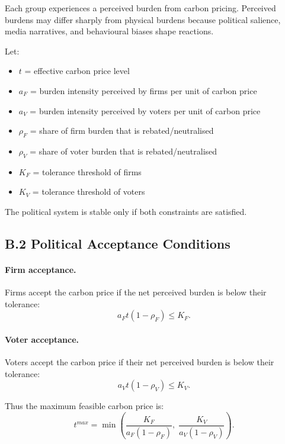 \documentclass[12pt]{article}
\begin{document}
Each group experiences a perceived burden from carbon pricing. Perceived burdens may differ sharply from physical burdens because political salience, media narratives, and behavioural biases shape reactions.


Let:
\begin{itemize}
\item $t$ = effective carbon price level
\item $a_F$ = burden intensity perceived by firms per unit of carbon price
\item $a_V$ = burden intensity perceived by voters per unit of carbon price
\item $\rho_F$ = share of firm burden that is rebated/neutralised
\item $\rho_V$ = share of voter burden that is rebated/neutralised
\item $K_F$ = tolerance threshold of firms
\item $K_V$ = tolerance threshold of voters
\end{itemize}


The political system is stable only if both constraints are satisfied.


\subsection*{B.2 Political Acceptance Conditions}


\paragraph{Firm acceptance.}
Firms accept the carbon price if the net perceived burden is below their tolerance:
\begin{equation}
a_F t (1 - \rho_F) \le K_F.
\end{equation}


\paragraph{Voter acceptance.}
Voters accept the carbon price if their net perceived burden is below their tolerance:
\begin{equation}
a_V t (1 - \rho_V) \le K_V.
\end{equation}


Thus the maximum feasible carbon price is:
\begin{equation}
t^{max} = \min \left( \frac{K_F}{a_F (1 - \rho_F)}, \; \frac{K_V}{a_V (1 - \rho_V)} \right).
\end{equation}
\end{document}
